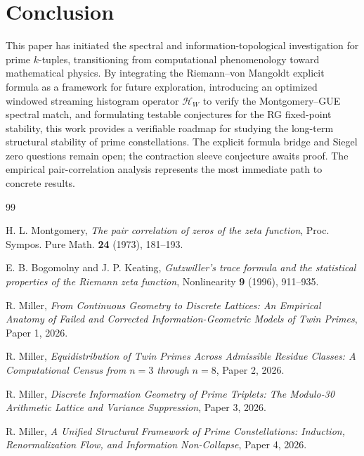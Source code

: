 \documentclass[11pt]{article}
\theoremstyle{remark}
\begin{document}
\section{Conclusion}
This paper has initiated the spectral and information-topological investigation for prime $k$-tuples, transitioning from computational phenomenology toward mathematical physics. By integrating the Riemann--von Mangoldt explicit formula as a framework for future exploration, introducing an optimized windowed streaming histogram operator $\mathcal{H}_W$ to verify the Montgomery--GUE spectral match, and formulating testable conjectures for the RG fixed-point stability, this work provides a verifiable roadmap for studying the long-term structural stability of prime constellations. The explicit formula bridge and Siegel zero questions remain open; the contraction sleeve conjecture awaits proof. The empirical pair-correlation analysis represents the most immediate path to concrete results.

\begin{thebibliography}{99}

H. L. Montgomery, \emph{The pair correlation of zeros of the zeta function},
Proc. Sympos. Pure Math. \textbf{24} (1973), 181--193.

E. B. Bogomolny and J. P. Keating, \emph{Gutzwiller's trace formula and the
statistical properties of the Riemann zeta function}, Nonlinearity \textbf{9}
(1996), 911--935.

R. Miller, \emph{From Continuous Geometry to Discrete Lattices: An Empirical
Anatomy of Failed and Corrected Information-Geometric Models of Twin Primes},
Paper 1, 2026.

R. Miller, \emph{Equidistribution of Twin Primes Across Admissible Residue
Classes: A Computational Census from $n=3$ through $n=8$}, Paper 2, 2026.

R. Miller, \emph{Discrete Information Geometry of Prime Triplets: The
Modulo-30 Arithmetic Lattice and Variance Suppression}, Paper 3, 2026.

R. Miller, \emph{A Unified Structural Framework of Prime Constellations:
Induction, Renormalization Flow, and Information Non-Collapse}, Paper 4, 2026.

\end{thebibliography}
\end{document}
